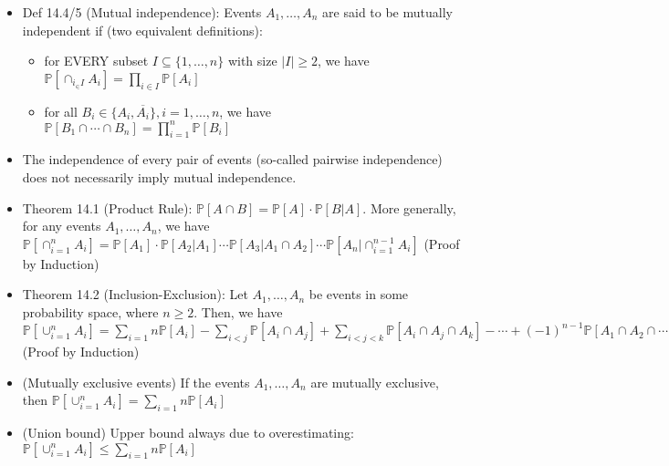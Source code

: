 \documentclass{article}
\begin{document}
\begin{itemize}
	\item Def 14.4/5 (Mutual independence): Events $A_1,\dots,A_n$ are said to be mutually independent if (two equivalent definitions):
	\begin{itemize}
		\item for {\color{red} EVERY} subset $I\subseteq \{1,\dots,n\}$ with size $|I|\geq2$, we have $\mathbb{P}[\cap_{i_\in I} A_i] = \prod\limits_{i\in I} \mathbb{P}[A_i]$
		\item for all $B_i\in\{A_i, \overline{A_i}\}, i=1,\dots,n$, we have $\mathbb{P}[B_1\cap\cdots\cap B_n] = \prod\limits_{i=1}^n \mathbb{P}[B_i]$
	\end{itemize}
	\item The independence of every pair of events (so-called pairwise independence) does not necessarily imply mutual independence.
	\item Theorem 14.1 (Product Rule): $\mathbb{P}[A\cap B] = \mathbb{P}[A]\cdot\mathbb{P}[B|A]$. More generally, for any events $A_1,\dots, A_n$, we have
	$\mathbb{P}[\cap_{i=1}^n A_i] = \mathbb{P}[A_1]\cdot\mathbb{P}[A_2|A_1]\cdots\mathbb{P}[A_3|A_1\cap A_2]\cdots\mathbb{P}[A_n|\cap_{i=1}^{n-1} A_i]$ (Proof by Induction)
	\item Theorem 14.2 (Inclusion-Exclusion): Let $A_1,\dots,A_n$ be events in some probability space, where $n\geq2$. Then, we have $\mathbb{P}[\cup_{i=1}^n A_i] = \sum\limits_{i=1}{n}\mathbb{P}[A_i] - \sum\limits_{i<j}\mathbb{P}[A_i\cap A_j] + \sum\limits_{i<j<k} \mathbb{P}[A_i\cap A_j\cap A_k] -\cdots +(-1)^{n-1}\mathbb{P}[A_1\cap A_2\cap\cdots\cap A_n]$ (Proof by Induction)
	\item (Mutually exclusive events) If the events $A_1,\dots,A_n$ are mutually exclusive, then $\mathbb{P}[\cup_{i=1}^n A_i] = \sum\limits_{i=1}{n} \mathbb{P}[A_i]$
	\item (Union bound) Upper bound always due to overestimating: $\mathbb{P}[\cup_{i=1}^n A_i] \leq \sum\limits_{i=1}{n} \mathbb{P}[A_i]$
\end{itemize}
\end{document}
